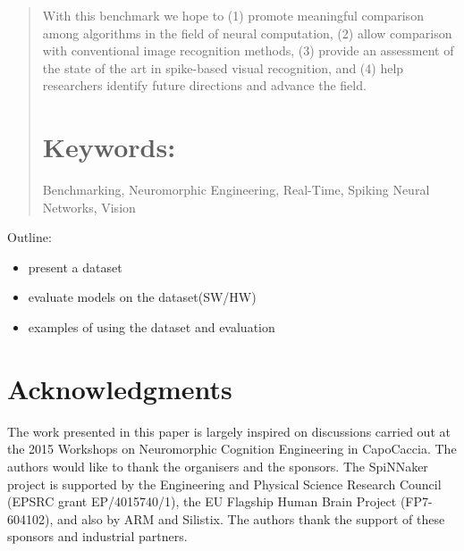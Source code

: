\documentclass[pdftex]{bioinfo}
\begin{document}
\begin{abstract}
With this benchmark we hope to (1) promote meaningful comparison among algorithms in the field of neural computation, (2) allow comparison with conventional image recognition methods, (3) provide an assessment of the state of the art in spike-based visual recognition, and (4) help researchers identify future directions and advance the field.

\tiny
\section{Keywords:} Benchmarking, Neuromorphic Engineering, Real-Time, Spiking Neural Networks, Vision
\end{abstract}

Outline:
\begin{itemize}
	\item present a dataset
	\item evaluate models on the dataset(SW/HW)
	\item examples of using the dataset and evaluation
\end{itemize}







\section*{Acknowledgments}
The work presented in this paper is largely inspired on discussions carried out at the 2015 Workshops on Neuromorphic Cognition Engineering in CapoCaccia.
The authors would like to thank the organisers and the sponsors.
The SpiNNaker project is supported by the Engineering and Physical Science Research Council (EPSRC grant EP/4015740/1), the EU Flagship Human Brain Project (FP7-604102), and also by ARM and Silistix.
The authors thank the support of these sponsors and industrial partners.


\end{document}
